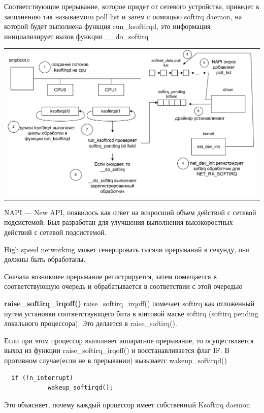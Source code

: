 Соответствующие прерывание, которое придет от сетевого устройства, приведет к заполнению так называемого poll list и затем с помощью softirq daemon, на которой будет выполнена функция run\_ksoftirqd, это информация инициализирует вызов функции \_\_do\_softirq

\begin{table}[h!]
  \centering
  \begin{tabular}{p{1\linewidth}}
    \centering
    \includegraphics[width=0.8\linewidth]{./images/softirq.pdf}
  \end{tabular}
\end{table}

NAPI --- New API, появилось как ответ на возросший объем действий с сетевой подсистемой. Был разработан для улучшения выполнения высокоростных действий с сетевой подсистемой. 

High speed networking может генерировать тысячи прерываний в секунду, они должны быть обработаны.

Сначала возникшее прерывание регистрируется, затем помещается в соответствующую очередь и обрабатывается в соответствии с этой очередью

\textbf{raise\_softirq\_irqoff()}
raise\_softirq\_irqoff() помечает softirq как отложенный путем установки соответствующего бита в юитовой маске softirq (softirq pending локального процессора). Это делается в raise\_softirq().

Если при этом процессор выполняет аппаратное прерывание, то осуществляется выход из функции raise\_softirq\_irqoff() и восстанавливается флаг IF. В противном случае(если не в прерывании) вызываетс wakeup\_softirqd()

\begin{lstlisting}
  if (!n_interrupt)
            wakeup_softirqd();
\end{lstlisting}

Это объясняет, почему каждый процессор имеет собственный Ksoftirq daemon





